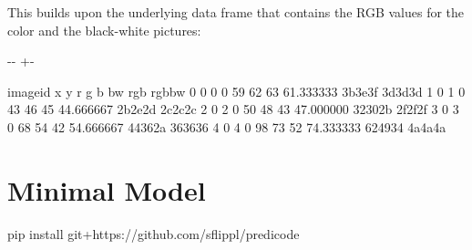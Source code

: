 \documentclass[letterpaper,10pt,english]{sphinxmanual}
\newlength\nbsphinxcodecellspacing
\begin{document}
This builds upon the underlying data frame that contains the RGB values for the color and the black-white pictures:

{
\begin{sphinxVerbatim}[commandchars=\\\{\}]
\llap{\color{nbsphinxin}[4]:\,\hspace{\fboxrule}\hspace{\fboxsep}}  
\end{sphinxVerbatim}
}

{

\kern-\sphinxverbatimsmallskipamount\kern-\baselineskip
\kern+\FrameHeightAdjust\kern-\fboxrule
\vspace{\nbsphinxcodecellspacing}

\begin{sphinxVerbatim}[commandchars=\\\{\}]
\llap{\color{nbsphinxout}[4]:\,\hspace{\fboxrule}\hspace{\fboxsep}}   image\PYGZus{}id  x  y   r   g   b         bw      rgb   rgb\PYGZus{}bw
0         0  0  0  59  62  63  61.333333  \PYGZsh{}3b3e3f  \PYGZsh{}3d3d3d
1         0  1  0  43  46  45  44.666667  \PYGZsh{}2b2e2d  \PYGZsh{}2c2c2c
2         0  2  0  50  48  43  47.000000  \PYGZsh{}32302b  \PYGZsh{}2f2f2f
3         0  3  0  68  54  42  54.666667  \PYGZsh{}44362a  \PYGZsh{}363636
4         0  4  0  98  73  52  74.333333  \PYGZsh{}624934  \PYGZsh{}4a4a4a
\end{sphinxVerbatim}
}


\chapter{Minimal Model}
\label{\detokenize{usage/minimal_model:Minimal-Model}}\label{\detokenize{usage/minimal_model::doc}}
{
\begin{sphinxVerbatim}[commandchars=\\\{\}]
\llap{\color{nbsphinxin}[10]:\,\hspace{\fboxrule}\hspace{\fboxsep}}
       
    pip install git+https://github.com/sflippl/predicode
       
\end{sphinxVerbatim}
}
\end{document}
